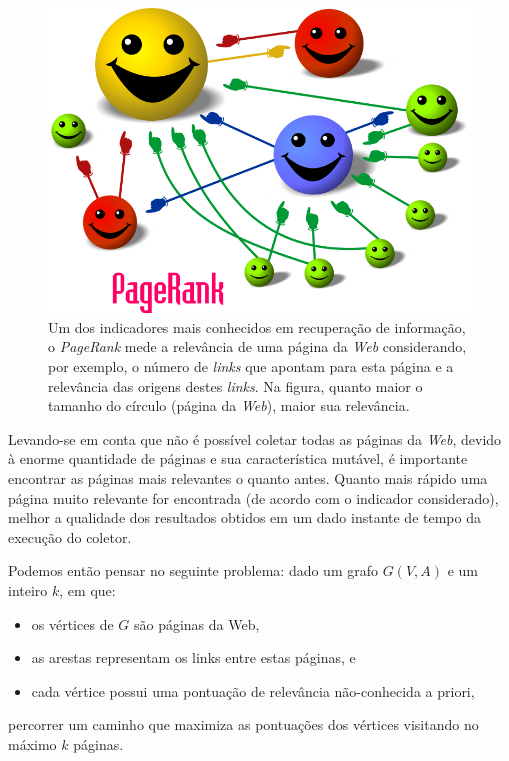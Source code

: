 \documentclass[a4paper,12pt,titlepage]{article}
\begin{document}
\begin{figure}[H]
     \centering
     \includegraphics[scale=0.3]{figures/pagerank.png}
     \caption{Um dos indicadores mais conhecidos em recuperação de informação, o \textit{PageRank} mede a relevância de uma página da \textit{Web} considerando, por exemplo, o número de \textit{links} que apontam para esta página e a relevância das origens destes \textit{links}. Na figura, quanto maior o tamanho do círculo (página da \textit{Web}), maior sua relevância.}
     \label{bsp}
\end{figure}

Levando-se em conta que não é possível coletar todas as páginas da \textit{Web}, devido à enorme quantidade de páginas e sua característica mutável, é importante encontrar as páginas mais relevantes o quanto antes. Quanto mais rápido uma página muito relevante for encontrada (de acordo com o indicador considerado), melhor a qualidade dos resultados obtidos em um dado instante de tempo da execução do coletor.

Podemos então pensar no seguinte problema: dado um grafo $G(V,A)$ e um inteiro $k$, em que: 
\begin{itemize}[leftmargin=1.6cm]
    \item os vértices de $G$ são páginas da Web, 
    \item as arestas representam os links entre estas páginas, e
    \item cada vértice possui uma pontuação de relevância não-conhecida a priori,
\end{itemize}
percorrer um caminho que maximiza as pontuações dos vértices visitando no máximo $k$ páginas. \\ 
\end{document}
